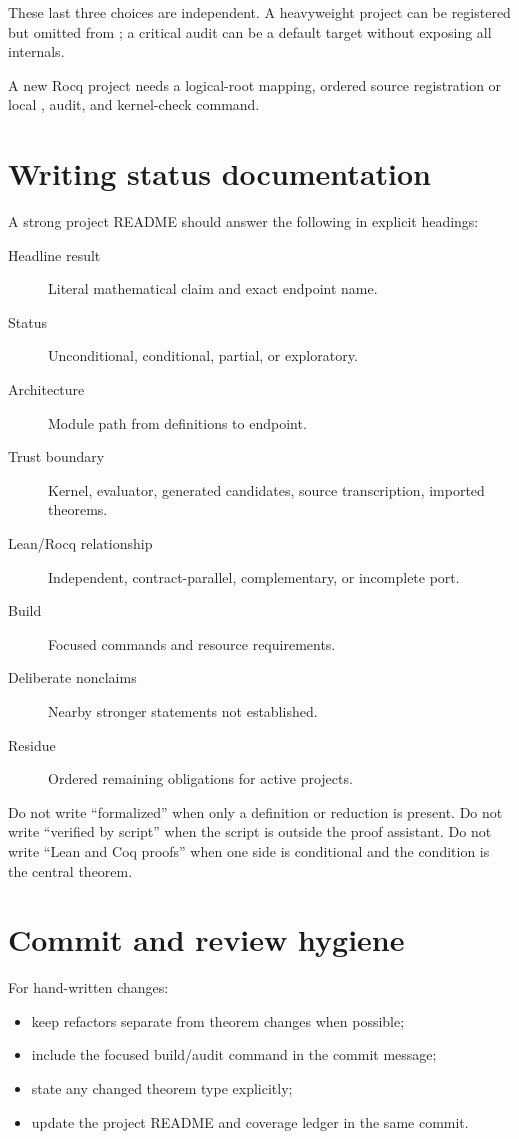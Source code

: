 \documentclass[
  10pt,
  a4paper,
  twoside,
  open=any,
  parskip=half,
  headings=big
]{scrreprt}
\newcommand{\code}[1]{\texttt{\detokenize{#1}}}
\begin{document}
These last three choices are independent.  A heavyweight project can be
registered but omitted from \code{ProveIt.lean}; a critical audit can be a
default target without exposing all internals.

A new Rocq project needs a logical-root mapping, ordered source registration
or local \code{_CoqProject}, audit, and kernel-check command.

\section{Writing status documentation}

A strong project README should answer the following in explicit headings:

\begin{description}
  \item[Headline result] Literal mathematical claim and exact endpoint name.
  \item[Status] Unconditional, conditional, partial, or exploratory.
  \item[Architecture] Module path from definitions to endpoint.
  \item[Trust boundary] Kernel, evaluator, generated candidates, source
        transcription, imported theorems.
  \item[Lean/Rocq relationship] Independent, contract-parallel, complementary,
        or incomplete port.
  \item[Build] Focused commands and resource requirements.
  \item[Deliberate nonclaims] Nearby stronger statements not established.
  \item[Residue] Ordered remaining obligations for active projects.
\end{description}

Do not write ``formalized'' when only a definition or reduction is present.
Do not write ``verified by script'' when the script is outside the proof
assistant.  Do not write ``Lean and Coq proofs'' when one side is conditional
and the condition is the central theorem.

\section{Commit and review hygiene}

For hand-written changes:

\begin{itemize}
  \item keep refactors separate from theorem changes when possible;
  \item include the focused build/audit command in the commit message;
  \item state any changed theorem type explicitly;
  \item update the project README and coverage ledger in the same commit.
\end{itemize}
\end{document}
